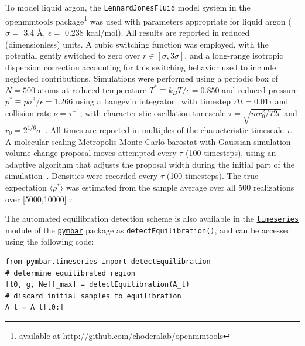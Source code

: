 \documentclass[aps,pre,twocolumn,nofootinbib,superscriptaddress,linenumbers,11point]{revtex4-1}
\newcommand{\expect}[1]{\langle #1 \rangle}                %
\begin{document}
To model liquid argon, the {\tt LennardJonesFluid} model system in the \href{http://github.com/choderalab/openmmtools}{openmmtools} package\footnote{available at \url{http://github.com/choderalab/openmmtools}} was used with parameters appropriate for liquid argon ($\sigma = $ 3.4 \AA, $\epsilon = $ 0.238 kcal/mol).
All results are reported in reduced (dimensionless) units.
A cubic switching function was employed, with the potential gently switched to zero over $r \in [\sigma, 3 \sigma]$, and a long-range isotropic dispersion correction accounting for this switching behavior used to include neglected contributions.
Simulations were performed using a periodic box of $N = 500$ atoms at reduced temperature $T^* \equiv k_B T / \epsilon = 0.850$ and reduced pressure $p^* \equiv p \sigma^3 / \epsilon = 1.266$ using a Langevin integrator~\cite{sivak-chodera-crooks:jpcb:2014:vvvr} with timestep $\Delta t = 0.01 \tau$ and collision rate $\nu = \tau^{-1}$, with characteristic oscillation timescale $\tau = \sqrt{m r_0^2 / 72 \epsilon}$ and $r_0 = 2^{1/6} \sigma$~\cite{liquid-argon-characteristic-timescale}.
All times are reported in multiples of the characteristic timescale $\tau$.
A molecular scaling Metropolis Monte Carlo barostat with Gaussian simulation volume change proposal moves attempted every $\tau$ (100 timesteps), using an adaptive algorithm that adjusts the proposal width during the initial part of the simulation~\cite{eastman:jctc:2012:openmm}.
Densities were recorded every $\tau$ (100 timesteps).
The true expectation $\expect{ \rho^* }$ was estimated from the sample average over all 500 realizations over [5000,10000] $\tau$.

The automated equilibration detection scheme is also available in the \href{http://pymbar.readthedocs.org/en/latest/timeseries.html}{\tt timeseries} module of the \href{http://github.com/choderalab/pymbar}{\tt pymbar} package as {\tt detectEquilibration()}, and can be accessed using the following code:

\begin{verbatim}
from pymbar.timeseries import detectEquilibration
# determine equilibrated region
[t0, g, Neff_max] = detectEquilibration(A_t)
# discard initial samples to equilibration
A_t = A_t[t0:]
\end{verbatim}

\end{document}
